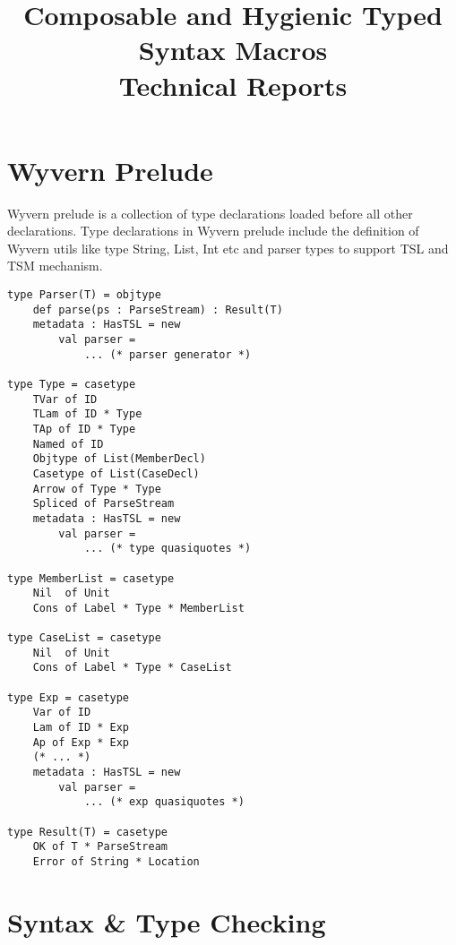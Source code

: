 \documentclass[letterpaper, notitlepage]{article}
\begin{document}
\title{Composable and Hygienic Typed Syntax Macros\\Technical Reports}
\date{}
\maketitle

\section{Wyvern Prelude}
Wyvern prelude is a collection of type declarations loaded before all other declarations. Type declarations in Wyvern prelude include the definition of Wyvern utils like type String, List, Int etc and parser types to support TSL and TSM mechanism.  
\begin{lstlisting}[style=wyvern]
type Parser(T) = objtype
	def parse(ps : ParseStream) : Result(T)
	metadata : HasTSL = new 
		val parser = 
			... (* parser generator *)

type Type = casetype
	TVar of ID
	TLam of ID * Type
	TAp of ID * Type
	Named of ID
	Objtype of List(MemberDecl)
	Casetype of List(CaseDecl)
	Arrow of Type * Type
	Spliced of ParseStream
	metadata : HasTSL = new
		val parser = 
			... (* type quasiquotes *)

type MemberList = casetype
	Nil  of Unit
	Cons of Label * Type * MemberList

type CaseList = casetype
	Nil  of Unit
	Cons of Label * Type * CaseList

type Exp = casetype
	Var of ID
	Lam of ID * Exp
	Ap of Exp * Exp
	(* ... *)
	metadata : HasTSL = new
		val parser = 
			... (* exp quasiquotes *)

type Result(T) = casetype
	OK of T * ParseStream
	Error of String * Location
\end{lstlisting}

\section{Syntax \& Type Checking}
\end{document}

